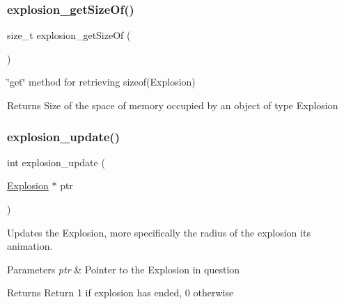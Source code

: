 \subsubsection{\texorpdfstring{explosion\+\_\+get\+Size\+Of()}{explosion\_getSizeOf()}}
{\footnotesize\ttfamily size\+\_\+t explosion\+\_\+get\+Size\+Of (\begin{DoxyParamCaption}{ }\end{DoxyParamCaption})}



\char`\"{}get\char`\"{} method for retrieving sizeof(\+Explosion) 

\begin{DoxyReturn}{Returns}
Size of the space of memory occupied by an object of type Explosion 
\end{DoxyReturn}
\hypertarget{group___missile_gabc0219cffe0a8c0060dabb7dfab4dbc3}{}\label{group___missile_gabc0219cffe0a8c0060dabb7dfab4dbc3} 
\subsubsection{\texorpdfstring{explosion\+\_\+update()}{explosion\_update()}}
{\footnotesize\ttfamily int explosion\+\_\+update (\begin{DoxyParamCaption}\item[{\hyperlink{group___missile_gab15157e0eccd9297f66644015d4966b1}{Explosion} $\ast$}]{ptr }\end{DoxyParamCaption})}



Updates the Explosion, more specifically the radius of the explosion its animation. 


\begin{DoxyParams}{Parameters}
{\em ptr} & Pointer to the Explosion in question\\
\hline
\end{DoxyParams}
\begin{DoxyReturn}{Returns}
Return 1 if explosion has ended, 0 otherwise 
\end{DoxyReturn}
\hypertarget{group___missile_gab2d6dfae85e8db5dd6444161120f2fc1}{}\label{group___missile_gab2d6dfae85e8db5dd6444161120f2fc1} 
